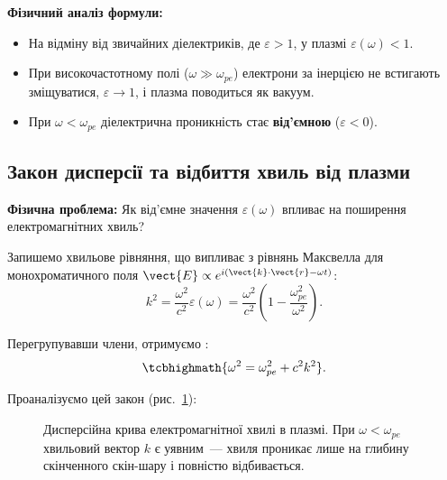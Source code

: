 \textbf{Фізичний аналіз формули:}
\begin{itemize}
	\item На відміну від звичайних діелектриків, де $\varepsilon > 1$, у плазмі $\varepsilon(\omega) < 1$.
	\item При високочастотному полі ($\omega \gg \omega_{pe}$) електрони за інерцією не встигають зміщуватися, $\varepsilon \to 1$, і плазма поводиться як вакуум.
	\item При $\omega < \omega_{pe}$ діелектрична проникність стає \textbf{від'ємною} ($\varepsilon < 0$).
\end{itemize}

\subsection{Закон дисперсії та відбиття хвиль від плазми}

\textbf{Фізична проблема:} Як від'ємне значення $\varepsilon(\omega)$ впливає на поширення електромагнітних хвиль?

Запишемо хвильове рівняння, що випливає з рівнянь Максвелла для монохроматичного поля $\vect{E} \propto e^{i(\vect{k}\cdot\vect{r} - \omega t)}$:
\begin{equation}
	k^2 = \frac{\omega^2}{c^2}\varepsilon(\omega) = \frac{\omega^2}{c^2}\left(1 - \frac{\omega_{pe}^2}{\omega^2}\right).
\end{equation}

Перегрупувавши члени, отримуємо :
\begin{equation}
	\tcbhighmath{\omega^2 = \omega_{pe}^2 + c^2 k^2}.
\end{equation}

Проаналізуємо цей закон (рис.~\ref{fig:plasma-dispersion-graph}):

\begin{figure}[htbp]\centering
	\caption{Дисперсійна крива електромагнітної хвилі в плазмі. При $\omega < \omega_{pe}$ хвильовий вектор $k$ є уявним~--- хвиля проникає лише на глибину скінченного скін-шару і повністю відбивається.}\label{fig:plasma-dispersion-graph}
\end{figure}

